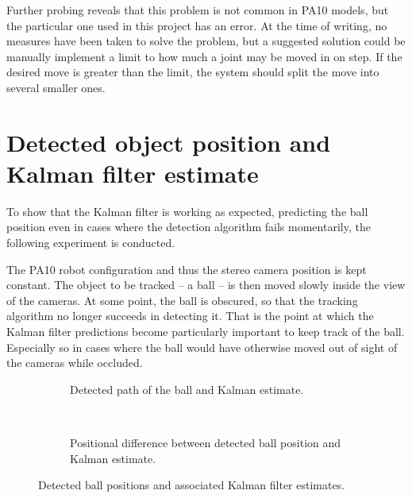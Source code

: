 Further probing reveals that this problem is not common in PA10 models, but the particular one used in this project has an error.
At the time of writing, no measures have been taken to solve the problem, but a suggested solution could be manually implement a limit to how much a joint may be moved in on step.
If the desired move is greater than the limit, the system should split the move into several smaller ones.




\section{Detected object position and Kalman filter estimate}
To show that the Kalman filter is working as expected, predicting the ball position even in cases where the detection algorithm fails momentarily, the following experiment is conducted.

The PA10 robot configuration and thus the stereo camera position is kept constant.
The object to be tracked -- a ball -- is then moved slowly inside the view of the cameras.
At some point, the ball is obscured, so that the tracking algorithm no longer succeeds in detecting it.
That is the point at which the Kalman filter predictions become particularly important to keep track of the ball.
Especially so in cases where the ball would have otherwise moved out of sight of the cameras while occluded.

\begin{figure}[htb]
    \centering
    \begin{subfigure}[b]{0.49\textwidth}
        \resizebox{\columnwidth}{!}{%
            
        }
        \caption{Detected path of the ball and Kalman estimate.}
        \label{fig:ball_kalman_3d}
    \end{subfigure}~
    \begin{subfigure}[b]{0.49\textwidth}
        \resizebox{\columnwidth}{!}{%
            
        }
        \caption{Positional difference between detected ball position and Kalman estimate.}
        \label{fig:ball_kalman_error}
    \end{subfigure}
    \caption{Detected ball positions and associated Kalman filter estimates.}
    \label{fig:kalman_test}
\end{figure}

